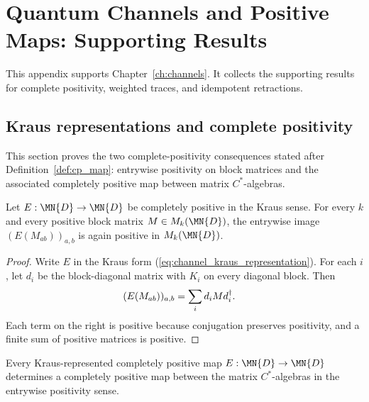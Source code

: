 \chapter{Quantum Channels and Positive Maps: Supporting Results}
\label{ch:channels_supporting_results}

This appendix supports Chapter~\ref{ch:channels}. It collects the
supporting results for complete positivity, weighted traces, and idempotent
retractions.

\section{Kraus representations and complete positivity}

This section proves the two complete-positivity consequences stated after
Definition~\ref{def:cp_map}: entrywise positivity on block matrices and the
associated completely positive map between matrix $C^*$-algebras.

\begin{theorem}
    \label{thm:cp_map_entrywise_complete_positive}
    \leanok
    Let $E : \MN{D} \to \MN{D}$ be completely positive in the Kraus sense.
    For every $k$ and every positive block matrix
    $M \in M_k(\MN{D})$, the entrywise image
    $(E(M_{ab}))_{a,b}$ is again positive in $M_k(\MN{D})$.
\end{theorem}

\begin{proof}\leanok
    Write $E$ in the Kraus form (\ref{eq:channel_kraus_representation}).
    For each $i$, let $d_i$ be the block-diagonal matrix with $K_i$ on every
    diagonal block. Then
    \begin{align}
        (E(M_{ab}))_{a,b}
         & =\sum_i d_i M d_i^\dagger.
        \notag
    \end{align}
    Each term on the right is positive because conjugation preserves
    positivity, and a finite sum of positive matrices is positive.
\end{proof}

\begin{theorem}
    \label{thm:cp_map_to_abstract_completely_positive}
    \leanok
    Every Kraus-represented completely positive map
    $E : \MN{D} \to \MN{D}$ determines a completely positive map between
    the matrix $C^*$-algebras in the entrywise positivity sense.
\end{theorem}


